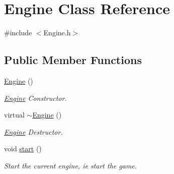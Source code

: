 \hypertarget{class_engine}{}\section{Engine Class Reference}
\label{class_engine}


{\ttfamily \#include $<$Engine.\+h$>$}

\subsection*{Public Member Functions}
\begin{DoxyCompactItemize}
\item 
\mbox{\label{class_engine_a8c98683b0a3aa28d8ab72a8bcd0d52f2}} 
\hyperlink{class_engine_a8c98683b0a3aa28d8ab72a8bcd0d52f2}{Engine} ()
\begin{DoxyCompactList}\small\item\em \hyperlink{class_engine}{Engine} Constructor. \end{DoxyCompactList}\item 
\mbox{\label{class_engine_a8ef7030a089ecb30bbfcb9e43094717a}} 
virtual \hyperlink{class_engine_a8ef7030a089ecb30bbfcb9e43094717a}{$\sim$\+Engine} ()
\begin{DoxyCompactList}\small\item\em \hyperlink{class_engine}{Engine} Destructor. \end{DoxyCompactList}\item 
\mbox{\label{class_engine_a4d8066dd213a03f5420d1bf60f150ca7}} 
void \hyperlink{class_engine_a4d8066dd213a03f5420d1bf60f150ca7}{start} ()
\begin{DoxyCompactList}\small\item\em Start the current engine, ie start the game. \end{DoxyCompactList}\end{DoxyCompactItemize}
